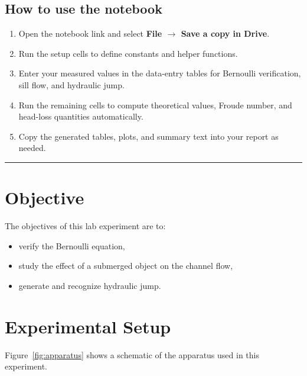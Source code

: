 \documentclass[12pt,letterpaper]{article}
\begin{document}
\subsection*{How to use the notebook}
\begin{enumerate}[leftmargin=*, label=\arabic*.]
    \item Open the notebook link and select \textbf{File $\to$ Save a copy in Drive}.
    \item Run the setup cells to define constants and helper functions.
    \item Enter your measured values in the data-entry tables for Bernoulli verification, sill flow, and hydraulic jump.
    \item Run the remaining cells to compute theoretical values, Froude number, and head-loss quantities automatically.
    \item Copy the generated tables, plots, and summary text into your report as needed.
\end{enumerate}
\vspace{1em}
\hrule
\vspace{1em}

\section{Objective}
The objectives of this lab experiment are to:
\begin{itemize}[leftmargin=*]
    \item verify the Bernoulli equation,
    \item study the effect of a submerged object on the channel flow,
    \item generate and recognize hydraulic jump.
\end{itemize}

\section{Experimental Setup}
Figure~\ref{fig:apparatus} shows a schematic of the apparatus used in this experiment.
\end{document}
